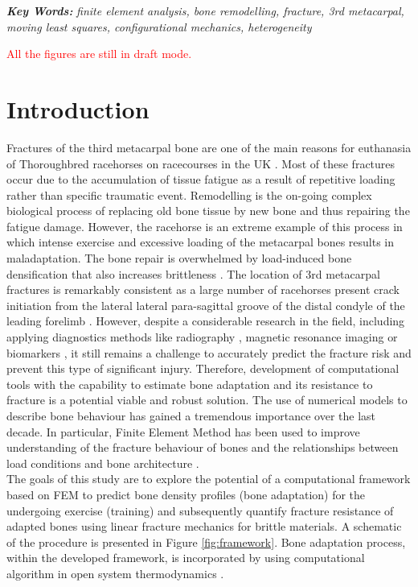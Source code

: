 \documentclass[11pt]{acmeArticle}
\numberwithin{equation}{section}
\begin{document}
{\textbf{\textit{Key Words:}} {\it finite element analysis, bone remodelling, fracture, 3rd metacarpal, moving least squares, configurational mechanics, heterogeneity}}
%
\\
\newpage

\textcolor{red}{All the figures are still in draft mode.}
\section{Introduction}
Fractures of the third metacarpal bone are one of the main reasons for euthanasia of Thoroughbred racehorses on racecourses in the UK \citep{Parkin2004risk}.
Most of these fractures occur due to the accumulation of tissue fatigue as a result of repetitive loading \citep{Parkin2005} rather than specific traumatic event.
Remodelling is the on-going complex biological process of replacing old bone tissue by new bone and thus repairing the fatigue damage\citep{hughes2017role}.
However, the racehorse is an extreme example of this process in which intense exercise and excessive loading of the metacarpal bones results in maladaptation.
The bone repair is overwhelmed by load-induced bone densification that also increases brittleness \citep{loughridge2017qualitative}.
The location of 3rd metacarpal fractures is remarkably consistent as a large number of racehorses present crack initiation from 
the lateral lateral para-sagittal groove of the distal condyle of the leading forelimb \citep{jacklin2012frequency, parkin2006analysis}.
However, despite a considerable research in the field, including applying diagnostics methods like radiography 
\citep{bogers2016quantitative, crijns2014intramodality, loughridge2017qualitative}, magnetic resonance imaging 
\citep{tranquille2017MRI} or biomarkers \citep{mcilwraith2005use}, it still remains a challenge to accurately predict the fracture risk 
and prevent this type of significant injury.
Therefore, development of computational tools with the capability to estimate bone adaptation and its resistance to fracture is a potential 
viable and robust solution.
The use of numerical models to describe bone behaviour has gained a tremendous importance over the last decade. 
In particular, Finite Element Method has been used to improve understanding of the fracture behaviour of bones and the relationships between load conditions and bone architecture \citep{podshivalov2014road, poelert2013patient}. \\
The goals of this study are to explore the potential of a computational framework based on FEM to predict bone density profiles 
(bone adaptation) for the undergoing exercise (training) and subsequently quantify fracture resistance of 
adapted bones using linear fracture mechanics for brittle materials. 
A schematic of the procedure is presented in Figure \ref{fig:framework}.
Bone adaptation process, within the developed framework, is incorporated by using computational algorithm in open system thermodynamics 
\citep{Kuhl2003a}.
\end{document}
